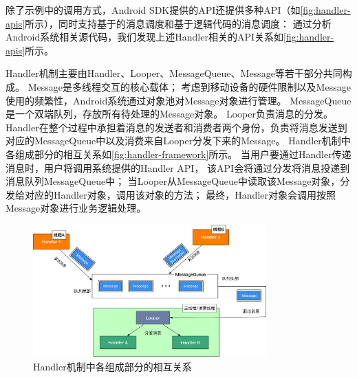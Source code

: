 除了示例中的调用方式，Android SDK提供的API\cite{HandlerA26:online}还提供多种API（如\autoref{fig:handler-apis}所示），同时支持基于的消息调度和基于逻辑代码的消息调度：
 通过分析Android系统相关源代码，我们发现上述Handler相关的API关系如\autoref{fig:handler-apis}所示。

Handler机制主要由Handler、Looper、MessageQueue、Message等若干部分共同构成。
 Message是多线程交互的核心载体；
考虑到移动设备的硬件限制以及Message使用的频繁性，Android系统通过对象池对Message对象进行管理。
MessageQueue是一个双端队列，存放所有待处理的Message对象。
Looper负责消息的分发。
Handler在整个过程中承担着消息的发送者和消费者两个身份，负责将消息发送到对应的MessageQueue中以及消费来自Looper分发下来的Message。
Handler机制中各组成部分的相互关系如\autoref{fig:handler-framework}所示。
当用户要通过Handler传递消息时，用户将调用系统提供的Handler API，
该API会将通过分发将消息投递到消息队列MessageQueue中；
当Looper从MessageQueue中读取该Message对象，分发给对应的Handler对象，调用该对象的方法；%
最终，Handler对象会调用按照Message对象进行业务逻辑处理。
\begin{figure}[!ht]
	\centering
	\includegraphics[width=0.8\textwidth]{./Figures/Handler-framework.png}
	\caption{ Handler机制中各组成部分的相互关系}
	\label{fig:handler-framework}
\end{figure}

